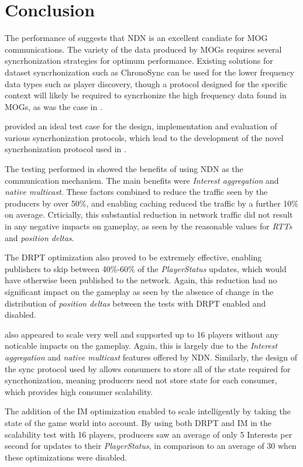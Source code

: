 \chapter{Conclusion}
The performance of \game{} suggests that NDN is an excellent candiate for MOG communications. The variety of the data produced by MOGs requires several syncrhonization strategies for optimum performance. Existing solutions for dataset syncrhonization such as ChronoSync can be used for the lower frequency data types such as player discovery, though a protocol designed for the specific context will likely be required to syncrhonize the high frequency data found in MOGs, as was the case in \game{}. 

\game{} provided an ideal test case for the design, implementation and evaluation of various syncrhonization protocols, which lead to the development of the novel syncrhonization protocol used in \game{}.

The testing performed in  showed the benefits of using NDN as the communication mechanism. The main benefits were \textit{Interest aggregation} and \textit{native multicast}. These factors combined to reduce the traffic seen by the producers by over 50\%, and enabling caching reduced the traffic by a further 10\% on average. Crticially, this substantial reduction in network traffic did not result in any negative impacts on gameplay, as seen by the reasonable values for \textit{RTTs} and \textit{position deltas}.

The DRPT optimization also proved to be extremely effective, enabling publishers to skip between 40\%-60\% of the \textit{PlayerStatus} updates, which would have otherwise been published to the network. Again, this reduction had no significant impact on the gameplay as seen by the absence of change in the distribution of \textit{position deltas} between the tests with DRPT enabled and disabled. 

\game{} also appeared to scale very well and supported up to 16 players without any noticable impacts on the gameplay. Again, this is largely due to the \textit{Interest aggregation} and \textit{native multicast} features offered by NDN. Similarly, the design of the sync protocol used by \game{} allows consumers to store all of the state required for syncrhonization, meaning producers need not store state for each consumer, which provides high consumer scalability. 

The addition of the IM optimization enabled \game{} to scale intelligently by taking the state of the game world into account. By using both DRPT and IM in the scalability test with 16 players, producers saw an average of only 5 Interests per second for updates to their \textit{PlayerStatus}, in comparison to an average of 30 when these optimizations were disabled. 


